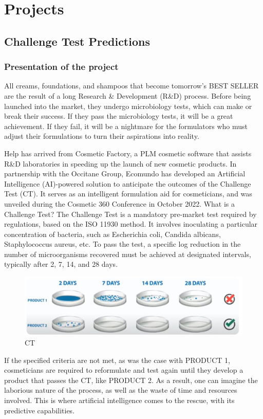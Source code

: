 \documentclass[a4paper,12pt,twoside]{report}
\begin{document}
\chapter{Projects}
\thispagestyle{empty}
\section{Challenge Test Predictions}
\subsection{Presentation of the project}
All creams, foundations, and shampoos that become tomorrow's BEST SELLER are the result of a long Research \& Development (R\&D) process. Before being launched into the market, they undergo microbiology tests, which can make or break their success. If they pass the microbiology tests, it will be a great achievement. If they fail, it will be a nightmare for the formulators who must adjust their formulations to turn their aspirations into reality.

Help has arrived from Cosmetic Factory, a PLM cosmetic software that assists R\&D laboratories in speeding up the launch of new cosmetic products. In partnership with the Occitane Group, Ecomundo has developed an Artificial Intelligence (AI)-powered solution to anticipate the outcomes of the Challenge Test (CT). It serves as an intelligent formulation aid for cosmeticians, and was unveiled during the Cosmetic 360 Conference in October 2022. 
What is a Challenge Test? The Challenge Test is a mandatory pre-market test required by regulations, based on the ISO 11930 method. It involves inoculating a particular concentration of bacteria, such as Escherichia coli, Candida albicans, Staphylococcus aureus, etc. To pass the test, a specific log reduction in the number of microorganisms recovered must be achieved at designated intervals, typically after 2, 7, 14, and 28 days.
\begin{figure}[H]
		\includegraphics[width=\textwidth]{images/CT}
	\caption[Challenge Test]{CT}
\end{figure}

If the specified criteria are not met, as was the case with PRODUCT 1, cosmeticians are required to reformulate and test again until they develop a product that passes the CT, like PRODUCT 2. As a result, one can imagine the laborious nature of the process, as well as the waste of time and resources involved. This is where artificial intelligence comes to the rescue, with its predictive capabilities.
\end{document}
